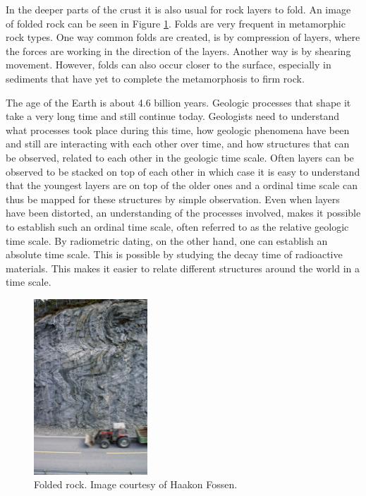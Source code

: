 \documentclass[a4paper,12pt]{report}
\begin{document}
In the deeper parts of the crust it is also usual for rock layers to fold. An image of folded rock can be seen in Figure \ref{fig:fold}. Folds are very frequent in metamorphic rock types. One way common folds are created, is by compression of layers, where the forces are working in the direction of the layers. Another way is by shearing movement. However, folds can also occur closer to the surface, especially in sediments that have yet to complete the metamorphosis to firm rock.



The age of the Earth is about 4.6 billion years. Geologic processes that shape it take a very long time and still continue today. Geologists need to understand what processes took place during this time, how geologic phenomena have been and still are interacting with each other over time, and how structures that can be observed, related to each other in the geologic time scale. Often layers can be observed to be stacked on top of each other in which case it is easy to understand that the youngest layers are on top of the older ones and a ordinal time scale can thus be mapped for these structures by simple observation. Even when layers have been distorted, an understanding of the processes involved, makes it possible to establish such an ordinal time scale, often referred to as the relative geologic time scale. By radiometric dating, on the other hand, one can establish an absolute time scale. This is possible by studying the decay time of radioactive materials. This makes it easier to relate different 
structures around the world in a time scale.
\begin{figure}
  \begin{center}
    \includegraphics[width=0.38\textwidth]{thesis/geo/fold.png}
  \end{center}
  \caption{Folded rock. Image courtesy of Haakon Fossen.}
  \label{fig:fold}
  
\end{figure}
\end{document}
